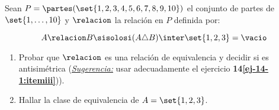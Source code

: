 \begin{enunciado}{\ejercicio}
  Sean $P = \partes(\set{1,2,3,4,5,6,7,8,9,10})$
  el conjunto de partes de $\set{1,\dots, 10}$ y $\relacion$ la relación en $P$ definida por:

  $$
    A \relacion B \sisolosi (A \triangle B) \inter \set{1,2,3} = \vacio
  $$

  \begin{enumerate}[label=\roman*)]
    \item  Probar que $\relacion$ es una relación de equivalencia y decidir si es antisimétrica
          (\textit{\underline{Sugerencia:}} usar adecuadamente el ejercicio \textbf{14\ref{ej-14-1:itemiii}})).

    \item Hallar la clase de equivalencia de $A = \set{1,2,3}$.
  \end{enumerate}
\end{enunciado}

